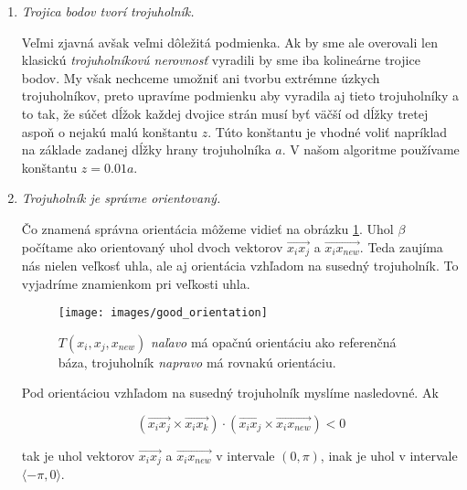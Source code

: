 \begin{enumerate}
    \item{
        \textit{Trojica bodov tvorí trojuholník.}


        Veľmi zjavná avšak veľmi dôležitá podmienka. Ak by sme ale overovali len klasickú 
        \textit{trojuholníkovú nerovnosť} vyradili by sme iba kolineárne trojice bodov. My však nechceme 
        umožniť ani tvorbu extrémne úzkych trojuholníkov, preto upravíme podmienku aby vyradila aj tieto
        trojuholníky a to tak, že súčet dĺžok každej dvojice strán musí byť väčší od dĺžky tretej aspoň
        o nejakú malú konštantu $z$. Túto konštantu je vhodné voliť napríklad na základe zadanej dĺžky 
        hrany trojuholníka $a$. V našom algoritme používame konštantu $z = 0.01 a$. 
    } 

    \item{
        \textit{Trojuholník je správne orientovaný.}


        Čo znamená správna orientácia môžeme vidieť na obrázku \ref{obr:good_orientation}. Uhol $\beta$
        počítame ako orientovaný uhol dvoch vektorov $\overrightarrow{x_i x_j}$ a $\overrightarrow{x_i x_{new}}$.
        Teda zaujíma nás nielen veľkosť uhla, ale aj orientácia vzhľadom na susedný trojuholník. To 
        vyjadríme znamienkom pri veľkosti uhla. 

        \begin{figure}
            \centerline{\texttt{[image: images/good\_orientation]}}
            \caption[Orientácia bázy vzhľadom na referenčnú bázu]
            {$T(x_i, x_j, x_{new})$ \textit{naľavo} má opačnú orientáciu ako referenčná báza, 
            trojuholník \textit{napravo} má rovnakú orientáciu.}
            \label{obr:good_orientation}
        \end{figure}

        Pod orientáciou vzhľadom na susedný trojuholník myslíme nasledovné.
        Ak

        \begin{equation}
        \label{eq:vector_space_orientation}
        (\overrightarrow{x_i x_j} \times \overrightarrow{x_i x_k}) 
        \cdot (\overrightarrow{x_i x_j} \times \overrightarrow{x_i x_{new}}) < 0
        \end{equation}

        tak je uhol vektorov $\overrightarrow{x_i x_j}$ a $\overrightarrow{x_i x_{new}}$ v intervale $(0, \pi)$, inak 
        je uhol v intervale $ \langle -\pi, 0 \rangle$.
        
}
\end{enumerate}
